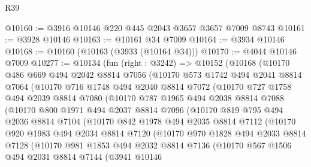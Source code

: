 \begin{lexlean}{R39}
\begin{coremodule}
@10160 := @3916 @10146 @220 @445 @2043 @3657 @3657 @7009 @8743
@10161 := @3928 @10146
@10163 := @10161 @34 @7009
@10164 := @3934 @10146
@10168 := @10160 (@10163 (@3933 (@10164 @34)))
@10170 := @4044 @10146 @7009
@10277 := @10134
    (fun (right : @3242) =>
    @10152
      (@10168
        (@10170
          @486
          @669
          @494
          @2042
          @8814
          @7056
          (@10170
            @573
            @1742
            @494
            @2041
            @8814
            @7064
            (@10170
              @716
              @1748
              @494
              @2040
              @8814
              @7072
              (@10170
                @727
                @1758
                @494
                @2039
                @8814
                @7080
                (@10170
                  @787
                  @1965
                  @494
                  @2038
                  @8814
                  @7088
                  (@10170
                    @800
                    @1971
                    @494
                    @2037
                    @8814
                    @7096
                    (@10170
                      @819
                      @795
                      @494
                      @2036
                      @8814
                      @7104
                      (@10170
                        @842
                        @1978
                        @494
                        @2035
                        @8814
                        @7112
                        (@10170
                          @920
                          @1983
                          @494
                          @2034
                          @8814
                          @7120
                          (@10170
                            @970
                            @1828
                            @494
                            @2033
                            @8814
                            @7128
                            (@10170
                              @981
                              @1853
                              @494
                              @2032
                              @8814
                              @7136
                              (@10170
                                @567
                                @1506
                                @494
                                @2031
                                @8814
                                @7144
                                (@3941
                                  @10146

\end{coremodule}
\end{lexlean}
